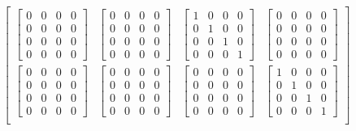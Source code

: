 \documentclass[twocolumn,10pt]{asme2ej}
\begin{document}
\begin{equation}
\begin{bmatrix}
        \begin{bmatrix} 0 & 0 & 0 & 0 \\ 0 & 0 & 0 & 0 \\ 0 & 0 & 0 & 0 \\ 0 & 0 & 0 & 0 \end{bmatrix} &
        \begin{bmatrix} 0 & 0 & 0 & 0 \\ 0 & 0 & 0 & 0 \\ 0 & 0 & 0 & 0 \\ 0 & 0 & 0 & 0 \end{bmatrix} &
        \begin{bmatrix} 1 & 0 & 0 & 0 \\ 0 & 1 & 0 & 0 \\ 0 & 0 & 1 & 0 \\ 0 & 0 & 0 & 1 \end{bmatrix} &
        \begin{bmatrix} 0 & 0 & 0 & 0 \\ 0 & 0 & 0 & 0 \\ 0 & 0 & 0 & 0 \\ 0 & 0 & 0 & 0 \end{bmatrix} \\
          \begin{bmatrix} 0 & 0 & 0 & 0 \\ 0 & 0 & 0 & 0 \\ 0 & 0 & 0 & 0 \\ 0 & 0 & 0 & 0 \end{bmatrix} &
          \begin{bmatrix} 0 & 0 & 0 & 0 \\ 0 & 0 & 0 & 0 \\ 0 & 0 & 0 & 0 \\ 0 & 0 & 0 & 0 \end{bmatrix} &
          \begin{bmatrix} 0 & 0 & 0 & 0 \\ 0 & 0 & 0 & 0 \\ 0 & 0 & 0 & 0 \\ 0 & 0 & 0 & 0 \end{bmatrix} &
          \begin{bmatrix} 1 & 0 & 0 & 0 \\ 0 & 1 & 0 & 0 \\ 0 & 0 & 1 & 0 \\ 0 & 0 & 0 & 1 \end{bmatrix} \\ \end{bmatrix}
\label{eq_cublambda}
\end{equation}
\end{document}

